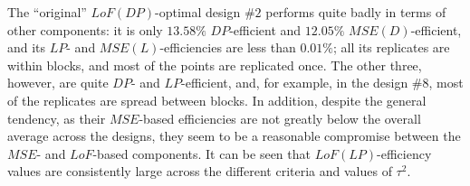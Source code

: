 The ``original'' $LoF(DP)$-optimal design \#$2$ performs quite badly in terms of other components: it is only $13.58\%$ $DP$-efficient and  $12.05\%$ $MSE(D)$-efficient, and its $LP$- and $MSE(L)$-efficiencies are less than $0.01\%$; all its replicates are within blocks, and most of the points are replicated once. The other three, however, are quite $DP$- and $LP$-efficient, and, for example, in the design \#$8$, most of the replicates are spread between blocks. In addition, despite the general tendency, as their $MSE$-based efficiencies are not greatly below the overall average across the designs, they seem to be a reasonable compromise between the $MSE$- and $LoF$-based components. It can be seen that $LoF(LP)$-efficiency values are consistently large across the different criteria and values of $\tau^2$. 


